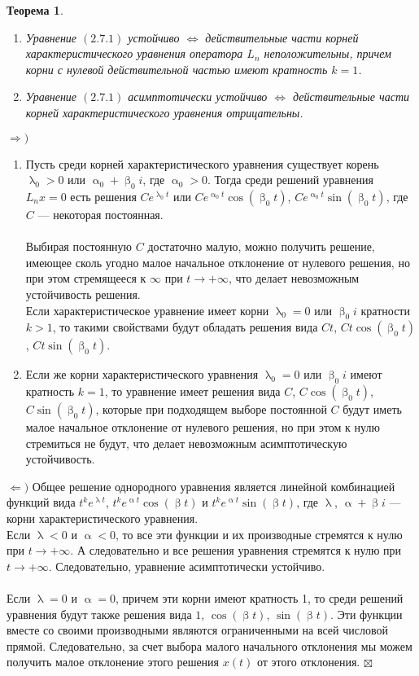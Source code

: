 \documentclass[a4paper, 12pt]{report}
\newenvironment{Proof} %
{\par\noindent{$\blacklozenge$}} %
{\hfill$\scriptstyle\boxtimes$}
\renewcommand{\alpha}{\upalpha}
\renewcommand{\beta}{\upbeta}
\renewcommand{\lambda}{\uplambda}
\newtheorem*{theorem}{Теорема}
\begin{document}
\begin{theorem}
	\begin{enumerate}
		\item Уравнение $(2.7.1)$ устойчиво $\Longleftrightarrow$ действительные части корней характеристического уравнения оператора $L_n$ неположительны, причем корни с нулевой действительной частью имеют кратность $k = 1$.
		\item Уравнение $(2.7.1)$ асимптотически устойчиво $\Longleftrightarrow$ действительные части корней характеристического уравнения отрицательны.
	\end{enumerate}
\end{theorem}\begin{Proof}
$\Rightarrow)$\begin{enumerate}
	\item Пусть среди корней характеристического уравнения существует корень $\lambda_0 > 0$ или $\alpha_0 + \beta_0i$, где $\alpha_0 > 0$. Тогда среди решений уравнения $L_nx = 0$ есть решения $Ce^{\lambda_0 t}$ или $Ce^{\alpha_0t}\cos(\beta_0 t)$, $Ce^{\alpha_0t}\sin(\beta_0 t)$, где $C$ --- некоторая постоянная.\\\\
	Выбирая постоянную $C$ достаточно малую, можно получить решение, имеющее сколь угодно малое начальное отклонение от нулевого решения, но при этом стремящееся к $\infty$ при $t\rightarrow +\infty$, что делает невозможным устойчивость решения.\\ Если характеристическое уравнение имеет корни $\lambda_0 = 0$ или $\beta_0 i$ кратности $k > 1$, то такими свойствами будут обладать решения вида $Ct$, $Ct\cos(\beta_0t)$, $Ct\sin(\beta_0t)$.
	\item Если же корни характеристического уравнения $\lambda_0 = 0$ или $\beta_0i$ имеют кратность $k = 1$, то уравнение имеет решения вида $C$, $C\cos(\beta_0t)$, $C\sin(\beta_0t)$, которые при подходящем выборе постоянной $C$ будут иметь малое начальное отклонение от нулевого решения, но при этом к нулю стремиться не будут, что делает невозможным асимптотическую устойчивость.
\end{enumerate}
$\Leftarrow)$ Общее решение однородного уравнения является линейной комбинацией функций вида $t^ke^{\lambda t}$, $t^ke^{\alpha t}\cos(\beta t)$ и $t^ke^{\alpha t}\sin(\beta t)$, где $\lambda$, $\alpha + \beta i$ --- корни характеристического уравнения.\\ Если $\lambda < 0$ и $\alpha < 0$, то все эти функции и их производные стремятся к нулю при $t \rightarrow +\infty$. А следовательно и все решения уравнения стремятся к нулю при $t \rightarrow +\infty$. Следовательно, уравнение асимптотически устойчиво.\\\\
Если $\lambda = 0$ и $\alpha = 0$, причем эти корни имеют кратность 1, то среди решений уравнения будут также решения вида $1$, $\cos(\beta t)$, $\sin(\beta t)$. Эти функции вместе со своими производными являются ограниченными на всей числовой прямой. Следовательно, за счет выбора малого начального отклонения мы можем получить малое отклонение этого решения $x(t)$ от этого отклонения.
\end{Proof}
\end{document}
